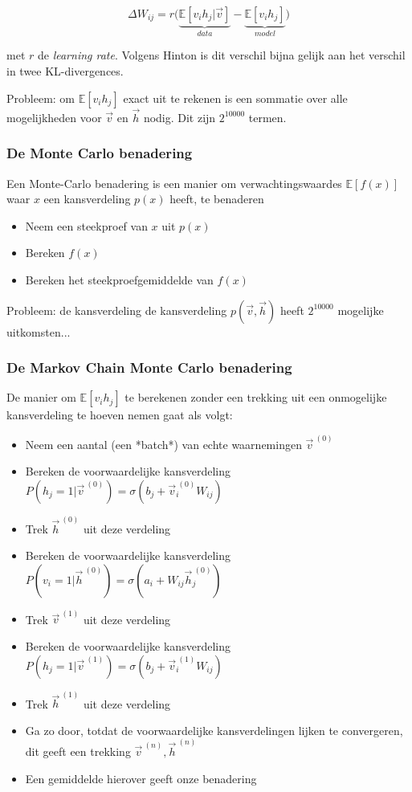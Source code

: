 {\[
\Delta W_{ij} = r \Big( \underbrace{\mathbb{E}[v_i h_j | \vec{v}]}_{data} - \underbrace{\mathbb{E}[v_i h_j]}_{model} \Big)
\]

met $r$ de \textit{learning rate}. Volgens Hinton is dit verschil bijna gelijk aan het verschil in twee KL-divergences.

Probleem: om $\mathbb{E}[v_i h_j]$ exact uit te rekenen is een sommatie over alle mogelijkheden voor $\vec{v}$ en $\vec{h}$ nodig. Dit zijn $2^{10000}$ termen.
\subsubsection{De Monte Carlo benadering}
Een Monte-Carlo benadering is een manier om verwachtingswaardes $\mathbb{E}[f(x)]$ waar $x$ een kansverdeling $p(x)$ heeft, te benaderen
\begin{itemize}
    \item Neem een steekproef van $x$ uit $p(x)$
    \item Bereken $f(x)$
    \item Bereken het steekproefgemiddelde van $f(x)$
\end{itemize}
\noindent Probleem: de kansverdeling de kansverdeling $p(\vec{v}, \vec{h})$ heeft $2^{10000}$ mogelijke uitkomsten...
\subsubsection{De Markov Chain Monte Carlo benadering}
De manier om $\mathbb{E}[v_i h_j]$ te berekenen zonder een trekking uit een onmogelijke kansverdeling te hoeven nemen gaat als volgt:
\begin{itemize}
    \item Neem een aantal (een *batch*) van echte waarnemingen $\vec{v}^{\ (0)}$
    \item Bereken de voorwaardelijke kansverdeling $P(h_j=1 | \vec{v}^{\ (0)}) = \sigma(b_j + \vec{v}^{\ (0)}_i W_{ij})$
    \item Trek $\vec{h}^{\ (0)}$ uit deze verdeling
    \item Bereken de voorwaardelijke kansverdeling $P(v_i=1 | \vec{h}^{\ (0)}) = \sigma(a_i + W_{ij}\vec{h}^{\ (0)}_j)$
    \item Trek $\vec{v}^{\ (1)}$ uit deze verdeling
    \item Bereken de voorwaardelijke kansverdeling $P(h_j=1 | \vec{v}^{\ (1)}) = \sigma(b_j + \vec{v}^{\ (1)}_i W_{ij})$
    \item Trek $\vec{h}^{\ (1)}$ uit deze verdeling
    \item Ga zo door, totdat de voorwaardelijke kansverdelingen lijken te convergeren, dit geeft een trekking $\vec{v}^{\ (n)}, \vec{h}^{\ (n)}$
    \item Een gemiddelde hierover geeft onze benadering
\end{itemize}




}
